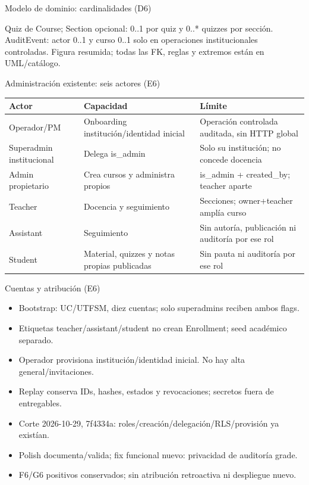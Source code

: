 \documentclass[aspectratio=169,10pt]{beamer}
\begin{document}
\begin{frame}{Modelo de dominio: cardinalidades (D6)}
\centering
\resizebox{0.96\textwidth}{!}{}
\par\vspace{.1cm}\scriptsize
Quiz de Course; Section opcional: 0..1 por quiz y 0..* quizzes por sección.
AuditEvent: actor 0..1 y curso 0..1 solo en operaciones institucionales controladas.
Figura resumida; todas las FK, reglas y extremos están en UML/catálogo.
\end{frame}
\begin{frame}{Administración existente: seis actores (E6)}
\scriptsize
\begin{tabularx}{\textwidth}{p{3cm}YY}
\toprule
Actor & Capacidad & Límite \\
\midrule
Operador/PM & Onboarding institución/identidad inicial & Operación controlada auditada, sin HTTP global \\
Superadmin institucional & Delega is\_admin & Solo su institución; no concede docencia \\
Admin propietario & Crea cursos y administra propios & is\_admin + created\_by; teacher aparte \\
Teacher & Docencia y seguimiento & Secciones; owner+teacher amplía curso \\
Assistant & Seguimiento & Sin autoría, publicación ni auditoría por ese rol \\
Student & Material, quizzes y notas propias publicadas & Sin pauta ni auditoría por ese rol \\
\bottomrule
\end{tabularx}

\end{frame}
\begin{frame}{Cuentas y atribución (E6)}
\small
\begin{itemize}
\item Bootstrap: UC/UTFSM, diez cuentas; solo superadmins reciben ambos flags.
\item Etiquetas teacher/assistant/student no crean Enrollment; seed académico separado.
\item Operador provisiona institución/identidad inicial. No hay alta general/invitaciones.
\item Replay conserva IDs, hashes, estados y revocaciones; secretos fuera de entregables.
\item Corte 2026-10-29, 7f4334a: roles/creación/delegación/RLS/provisión ya existían.
\item Polish documenta/valida; fix funcional nuevo: privacidad de auditoría grade.
\item F6/G6 positivos conservados; sin atribución retroactiva ni despliegue nuevo.
\end{itemize}
\end{frame}
\end{document}
